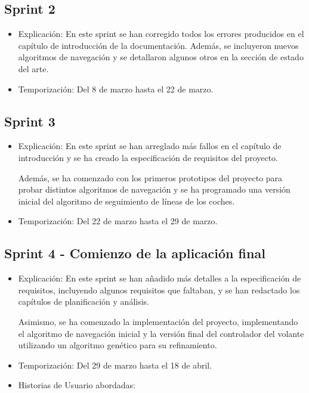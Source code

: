 \subsection{Sprint 2}
\begin{itemize}
    \item Explicación: En este sprint se han corregido todos los errores producidos en el capítulo de introducción de la documentación. Además, se incluyeron nuevos algoritmos de navegación y se detallaron algunos otros en la sección de estado del arte.
    \item Temporización: Del 8 de marzo hasta el 22 de marzo. 
\end{itemize}

\subsection{Sprint 3}
\begin{itemize}
    \item Explicación: En este sprint se han arreglado más fallos en el capítulo de introducción y se ha creado la especificación de requisitos del proyecto.
    
    Además, se ha comenzado con los primeros prototipos del proyecto para probar distintos algoritmos de navegación y se ha programado una versión inicial del algoritmo de seguimiento de líneas de los coches.
    \item Temporización: Del 22 de marzo hasta el 29 de marzo.
\end{itemize}


\subsection{Sprint 4 - Comienzo de la aplicación final}
\begin{itemize}
    \item Explicación: En este sprint se han añadido más detalles a la especificación de requisitos, incluyendo algunos requisitos que faltaban, y se han redactado los capítulos de planificación y análisis.
    
    Asimismo, se ha comenzado la implementación del proyecto, implementando el algoritmo de navegación inicial y la versión final del controlador del volante utilizando un algoritmo genético para su refinamiento.
    \item Temporización: Del 29 de marzo hasta el 18 de abril.
    \item Historias de Usuario abordadas: 
\end{itemize}

